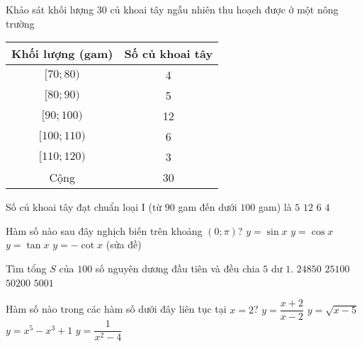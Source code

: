 \begin{ex}%
	Khảo sát khối lượng $30$ củ khoai tây ngẫu nhiên thu hoạch được ở một nông trường
	\begin{center}
		\begin{tabular}{|c|c|}
			\hline
			Khối lượng (gam) & Số củ khoai tây \\
			\hline
			$[70{;}80)$      & 4               \\
			$[80{;}90)$      & 5               \\
			$[90{;}100)$     & 12              \\
			$[100{;}110)$    & 6               \\
			$[110{;}120)$    & 3               \\
			\hline
			Cộng             & 30              \\
			\hline
		\end{tabular}
	\end{center}
	Số củ khoai tây đạt chuẩn loại I (từ $90$ gam đến dưới $100$ gam) là
	\choice
	{$5$}
	{\True $12$}
	{$6$}
	{$4$}
\end{ex}

\begin{ex}%
	Hàm số nào sau đây nghịch biến trên khoảng $\left(0;\pi \right)$?
	\choice
	{$y=\sin x$}
	{\True $y=\cos x$}
	{$y=\tan x$}
	{$y=-\cot x$ (sửa đề)}
\end{ex}

\begin{ex}%
	Tìm tổng $S$ của $100$ số nguyên dương đầu tiên và đều chia $5$ dư $1$.
	\choice
	{\True $24850$ }
	{ $25100$ }
	{ $50200$ }
	{ $5001$ }
\end{ex}

\begin{ex}%
	Hàm số nào trong các hàm số dưới đây liên tục tại $x=2$?
	\choice
	{$y=\dfrac{x+2}{x-2}$}
	{$y=\sqrt{x-5}$}
	{\True $y=x^5-x^3+1$}
	{$y=\dfrac{1}{x^2-4}$}
\end{ex}

